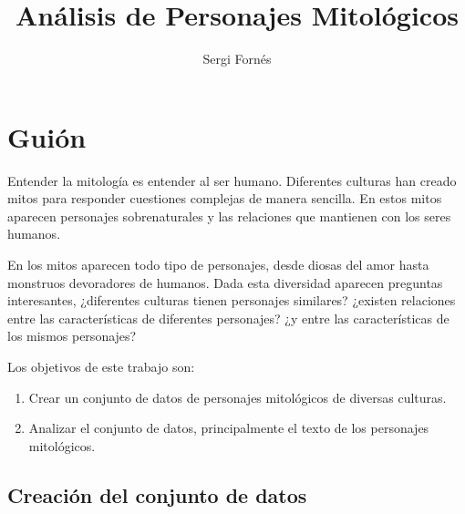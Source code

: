 \documentclass[letterpaper,11pt,twocolumn,twoside,]{pinp}
\title{Análisis de Personajes Mitológicos}
\author[]{Sergi Fornés}
\providecommand{\tightlist}{%
  \setlength{\itemsep}{0pt}\setlength{\parskip}{0pt}}
\begin{document}
\verticaladjustment{-2pt}

\maketitle
\thispagestyle{firststyle}



\hypertarget{guiuxf3n}{%
\section{Guión}\label{guiuxf3n}}

Entender la mitología es entender al ser humano. Diferentes culturas han
creado mitos para responder cuestiones complejas de manera sencilla. En
estos mitos aparecen personajes sobrenaturales y las relaciones que
mantienen con los seres humanos.

En los mitos aparecen todo tipo de personajes, desde diosas del amor
hasta monstruos devoradores de humanos. Dada esta diversidad aparecen
preguntas interesantes, ¿diferentes culturas tienen personajes
similares? ¿existen relaciones entre las características de diferentes
personajes? ¿y entre las características de los mismos personajes?

Los objetivos de este trabajo son:

\begin{enumerate}
\def\labelenumi{\arabic{enumi}.}
\tightlist
\item
  Crear un conjunto de datos de personajes mitológicos de diversas
  culturas.
\item
  Analizar el conjunto de datos, principalmente el texto de los
  personajes mitológicos.
\end{enumerate}

\hypertarget{creaciuxf3n-del-conjunto-de-datos}{%
\subsection{Creación del conjunto de
datos}\label{creaciuxf3n-del-conjunto-de-datos}}
\end{document}
